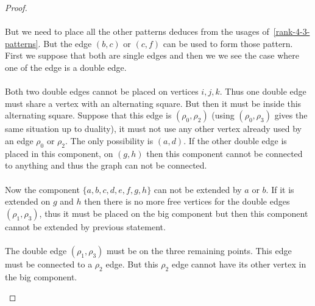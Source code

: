 \begin{proof}
  \paragraph{}
  But we need to place all the other patterns deduces from the usages of~\ref{rank-4-3-patterns}. But the edge $(b,c)$ or $(c,f)$ can be used to form those pattern. First we suppose that both are single edges and then we we see the case where one of the edge is a double edge.

  \paragraph{}
  Both two double edges cannot be placed on vertices $i,j,k$. Thus one double edge must share a vertex with an alternating square. But then it must be inside this alternating square. Suppose that this edge is $(\rho_0, \rho_2)$ (using $(\rho_0, \rho_3)$ gives the same situation up to duality), it must not use any other vertex already used by an edge $\rho_0$ or $\rho_2$. The only possibility is $(a,d)$. If the other double edge is placed in this component, on $(g,h)$ then this component cannot be connected to anything and thus the graph can not be connected.

  \paragraph{}
  Now the component $\{a,b,c,d,e,f,g,h\}$ can not be extended by $a$ or $b$. If it is extended on $g$ and $h$ then there is no more free vertices for the double edges $(\rho_1, \rho_3)$, thus it must be placed on the big component but then this component cannot be extended by previous statement.

  \paragraph{}
  The double edge $(\rho_1, \rho_3)$ must be on the three remaining points. This edge must be connected to a $\rho_2$ edge. But this $\rho_2$ edge cannot have its other vertex in the big component.

  \begin{figure}[H]
    \begin{center}
\end{center}
\end{figure}
\end{proof}
